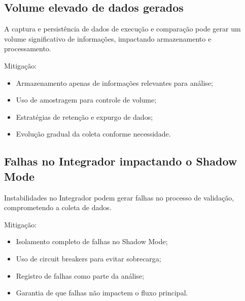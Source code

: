 \subsection{Volume elevado de dados gerados}

A captura e persistência de dados de execução e comparação pode gerar um volume significativo de informações, impactando armazenamento e processamento.

\vspace{0.5em}
Mitigação:

\begin{itemize}
    \item Armazenamento apenas de informações relevantes para análise;
    \item Uso de amostragem para controle de volume;
    \item Estratégias de retenção e expurgo de dados;
    \item Evolução gradual da coleta conforme necessidade.
\end{itemize}

\subsection{Falhas no Integrador impactando o Shadow Mode}

Instabilidades no Integrador podem gerar falhas no processo de validação, comprometendo a coleta de dados.

\vspace{0.5em}
Mitigação:

\begin{itemize}
    \item Isolamento completo de falhas no Shadow Mode;
    \item Uso de circuit breakers para evitar sobrecarga;
    \item Registro de falhas como parte da análise;
    \item Garantia de que falhas não impactem o fluxo principal.
\end{itemize}

